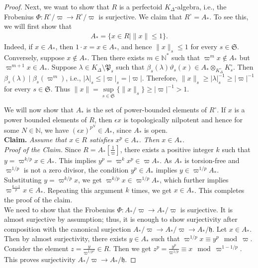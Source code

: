 \documentclass[12pts,a4paper]{amsart}
\begin{document}
\begin{proof}
 Next, we want to show that $R$ is a perfectoid $K_\Delta$-algebra, i.e., the Frobenius $\Phi: R^\circ/\varpi\to R^\circ/\varpi$ is surjective. We claim that $R^\circ=A_*$. To see this, we will first show that
 \begin{align*}
   A_*=\{x\in R\mid \|x\|\leq 1\}.
 \end{align*}
 Indeed, if $x\in A_*$, then $1\cdot x=x\in A_*$, and hence $\|x\|_s\leq 1$ for every $s\in\mathfrak{S}$. Conversely, suppose $x\notin A_*$. Then there exists $m\in\mathbb{N}^*$ such that $\varpi^{m} x\notin A_*$ but $\varpi^{m+1}x\in A_*$. Suppose $\lambda\in K_\Delta\setminus \mathfrak{P}_s$ such that $\beta_s(\lambda)\vartheta_s(x)\in A_*\otimes_{K^\circ_\Delta}K^\circ_s$. Then $\beta_s(\lambda)\mid \beta_s(\varpi^{m})$, i.e., $|\lambda|_s\leq |\varpi|_s=|\varpi|$. Therefore, $\|x\|_s\geq |\lambda|^{-1}_s\geq |\varpi|^{-1}$ for every $s\in\mathfrak{S}$. Thus $\|x\|=\sup\limits_{s\in\mathfrak{S}}\{\|x\|_s\}\geq |\varpi|^{-1}>1$.

 We will now show that $A_*$ is the set of power-bounded elements of $R^\circ$. If $x$ is a power bounded elements of $R$, then $\epsilon x$ is topologically nilpotent and hence for some $N\in\mathbb{N}$, we have $(\epsilon x)^{p^N}\in A_*$, since $A_*$ is open.\\ 

 \textbf{Claim.}\emph{ Assume that $x\in R$ satisfies $x^p\in A_*$. Then $x\in A_*$.}\\
 
 \emph{Proof of the Claim.} Since $R=A_*\left[\frac{1}{\varpi}\right]$, there exists a positive integer $k$ such that $y=\varpi^{k/p}x\in A_*$. This implies $y^p=\varpi^kx^p\in\varpi A_*$. As $A_*$ is torsion-free and $\varpi^{1/p}$ is not a zero divisor, the condition $y^p\in A_*$ implies $y\in \varpi^{1/p}A_*$. Substituting $y=\varpi^{k/p}x$, we get $\varpi^{k/p}x\in\varpi^{1/p}A_*$, which further implies $\varpi^{\frac{k-1}{p}}x\in A_*$. Repeating this argument $k$ times, we get $x\in A_*$. This completes the proof of the claim.\\
 
 We need to show that the Frobenius $\Phi: A_*/\varpi\to A_*/\varpi$ is surjective. It is almost surjective by assumption; thus, it is enough to show surjectivity after composition with the canonical surjection $A_*/\varpi\to A_*/\varpi\to A_*/\mathfrak{h}$. Let $x\in A_*$. Then by almost surjectivity, there exists $y\in A_*$ such that $\varpi^{1/p}x\equiv y^p\mod\varpi$. Consider the element $z=\frac{y}{\varpi^{1/p^2}}\in R$. Then we get $z^p=\frac{y^p}{\varpi^{1/p}}\equiv x\mod \varpi^{1-1/p}$. This proves surjectivity $A_*/\varpi\to A_*/\mathfrak{h}$.


\end{proof}
\end{document}
